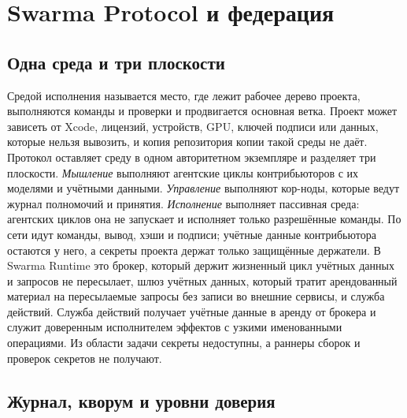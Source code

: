 \documentclass[10pt,a4paper]{article}
\begin{document}
\section{Swarma Protocol и федерация}
\label{sec:protocol}

\subsection{Одна среда и три плоскости}

Средой исполнения называется место, где лежит рабочее дерево проекта, выполняются команды и проверки и продвигается основная ветка. Проект может зависеть от Xcode, лицензий, устройств, GPU, ключей подписи или данных, которые нельзя вывозить, и копия репозитория копии такой среды не даёт. Протокол оставляет среду в одном авторитетном экземпляре и разделяет три плоскости. \emph{Мышление} выполняют агентские циклы контрибьюторов с их моделями и учётными данными. \emph{Управление} выполняют кор-ноды, которые ведут журнал полномочий и принятия. \emph{Исполнение} выполняет пассивная среда: агентских циклов она не запускает и исполняет только разрешённые команды. По сети идут команды, вывод, хэши и подписи; учётные данные контрибьютора остаются у него, а секреты проекта держат только защищённые держатели. В Swarma Runtime это брокер, который держит жизненный цикл учётных данных и запросов не пересылает, шлюз учётных данных, который тратит арендованный материал на пересылаемые запросы без записи во внешние сервисы, и служба действий. Служба действий получает учётные данные в аренду от брокера и служит доверенным исполнителем эффектов с узкими именованными операциями. Из области задачи секреты недоступны, а раннеры сборок и проверок секретов не получают.

\subsection{Журнал, кворум и уровни доверия}
\end{document}
